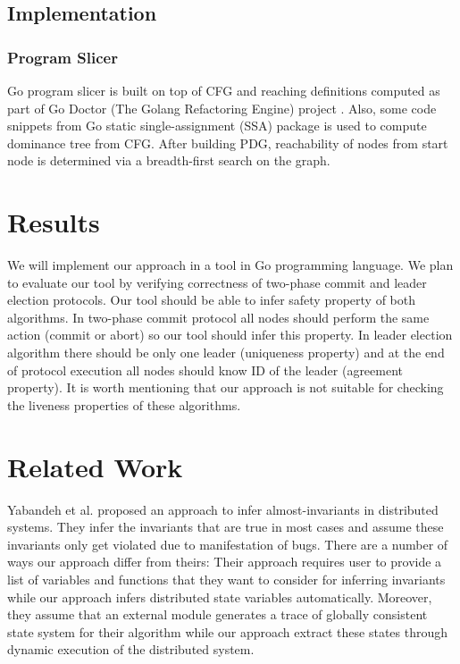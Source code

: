 \subsection{Implementation}

\subsubsection{Program Slicer}

Go program slicer is built on top of CFG and reaching definitions computed as part of Go Doctor (The Golang Refactoring Engine) project \cite{godoctor}. Also, some code snippets from Go static single-assignment (SSA) package \cite{ssa} is used to compute dominance tree from CFG. After building PDG, reachability of nodes from start node is determined via a breadth-first search on the graph.



\section{Results}
We will implement our approach in a tool in Go programming language. We plan to evaluate our tool by verifying correctness of two-phase commit and leader election protocols. Our tool should be able to infer safety property of both algorithms. In two-phase commit protocol all nodes should perform the same action (commit or abort) so our tool should infer this property. In leader election algorithm there should be only one leader (uniqueness property) and at the end of protocol execution all nodes should know ID of the leader (agreement property). It is worth mentioning that our approach is not suitable for checking the liveness properties of these algorithms.

\section{Related Work}

Yabandeh et al.\cite{yabandeh2011finding} proposed an approach to
infer almost-invariants in distributed systems. They infer the
invariants that are true in most cases and assume these invariants
only get violated due to manifestation of bugs. There are a number of
ways our approach differ from theirs: Their approach requires user to
provide a list of variables and functions that they want to consider
for inferring invariants while our approach infers distributed state
variables automatically. Moreover, they assume that an external module
generates a trace of globally consistent state system for their
algorithm while our approach extract these states through dynamic
execution of the distributed system.

